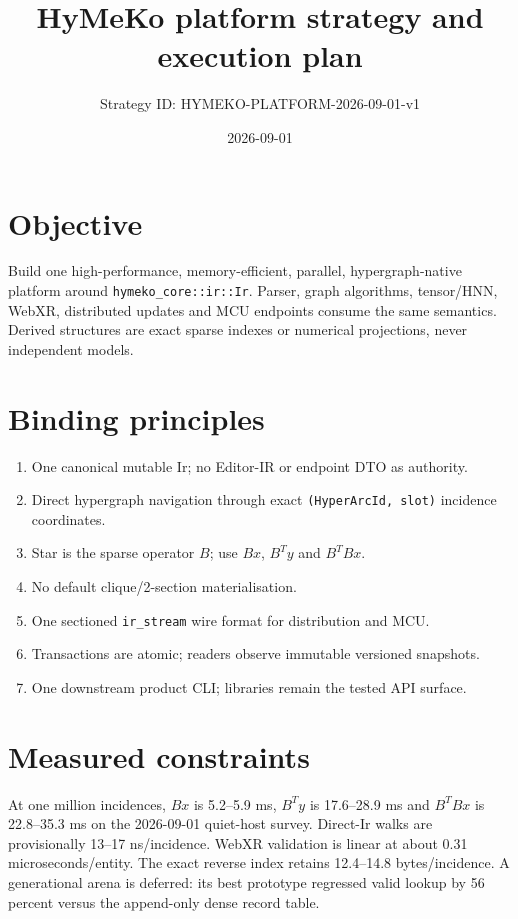 \documentclass[11pt,a4paper]{article}
\title{HyMeKo platform strategy and execution plan}
\author{Strategy ID: HYMEKO-PLATFORM-2026-09-01-v1}
\date{2026-09-01}
\begin{document}
\maketitle

\section{Objective}
Build one high-performance, memory-efficient, parallel, hypergraph-native
platform around \texttt{hymeko\_core::ir::Ir}. Parser, graph algorithms,
tensor/HNN, WebXR, distributed updates and MCU endpoints consume the same
semantics. Derived structures are exact sparse indexes or numerical projections,
never independent models.

\section{Binding principles}
\begin{enumerate}
  \item One canonical mutable Ir; no Editor-IR or endpoint DTO as authority.
  \item Direct hypergraph navigation through exact \texttt{(HyperArcId, slot)}
        incidence coordinates.
  \item Star is the sparse operator $B$; use $Bx$, $B^Ty$ and $B^TBx$.
  \item No default clique/2-section materialisation.
  \item One sectioned \texttt{ir\_stream} wire format for distribution and MCU.
  \item Transactions are atomic; readers observe immutable versioned snapshots.
  \item One downstream product CLI; libraries remain the tested API surface.
\end{enumerate}

\section{Measured constraints}
At one million incidences, $Bx$ is 5.2--5.9 ms, $B^Ty$ is 17.6--28.9 ms and
$B^TBx$ is 22.8--35.3 ms on the 2026-09-01 quiet-host survey. Direct-Ir walks
are provisionally 13--17 ns/incidence. WebXR validation is linear at about
0.31 microseconds/entity. The exact reverse index retains 12.4--14.8
bytes/incidence. A generational arena is deferred: its best prototype regressed
valid lookup by 56 percent versus the append-only dense record table.
\end{document}
